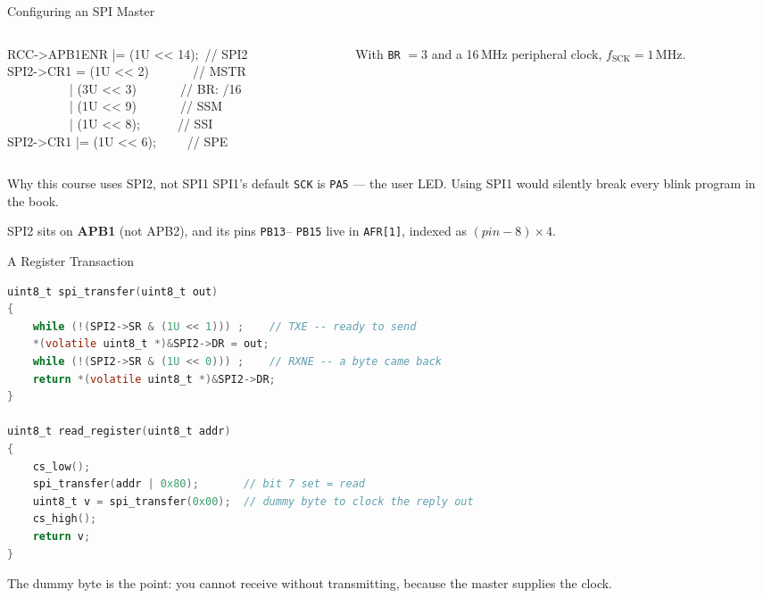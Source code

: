 \documentclass[9pt,aspectratio=169,xcolor=table]{beamer}
\begin{document}
\begin{frame}{Configuring an SPI Master}
    \begin{columns}[T]
    \begin{column}{.5\textwidth}
        {\ttfamily\scriptsize
        RCC->APB1ENR |= (1U << 14);~// SPI2 \\[1mm]
        SPI2->CR1 = (1U << 2)~~~~~~~// MSTR \\
        ~~~~~~~~~~| (3U << 3)~~~~~~~// BR: /16 \\
        ~~~~~~~~~~| (1U << 9)~~~~~~~// SSM \\
        ~~~~~~~~~~| (1U << 8);~~~~~~// SSI \\
        SPI2->CR1 |= (1U << 6);~~~~~// SPE}
    \end{column}
    \begin{column}{.46\textwidth}
        \begin{center}
        \end{center}

        \vspace{2mm}
        {\small With \texttt{BR} $=3$ and a 16\,MHz peripheral clock,
        $f_{\text{SCK}} = 1$\,MHz.}
    \end{column}
    \end{columns}

    \vspace{3mm}
    \begin{block}{Why this course uses SPI2, not SPI1}
        SPI1's default \texttt{SCK} is \alert{\texttt{PA5}} --- the user LED. Using
        SPI1 would silently break every blink program in the book.

        \vspace{1mm}
        SPI2 sits on \textbf{APB1} (not APB2), and its pins \texttt{PB13}--%
        \texttt{PB15} live in \texttt{AFR[1]}, indexed as $(pin-8) \times 4$.
    \end{block}
\end{frame}

\begin{frame}[fragile]{A Register Transaction}
\begin{lstlisting}[language=C, basicstyle=\ttfamily\scriptsize]
uint8_t spi_transfer(uint8_t out)
{
    while (!(SPI2->SR & (1U << 1))) ;    // TXE -- ready to send
    *(volatile uint8_t *)&SPI2->DR = out;
    while (!(SPI2->SR & (1U << 0))) ;    // RXNE -- a byte came back
    return *(volatile uint8_t *)&SPI2->DR;
}

uint8_t read_register(uint8_t addr)
{
    cs_low();
    spi_transfer(addr | 0x80);       // bit 7 set = read
    uint8_t v = spi_transfer(0x00);  // dummy byte to clock the reply out
    cs_high();
    return v;
}
\end{lstlisting}

    \vspace{1mm}
    {\small The \alert{dummy byte} is the point: you cannot receive without
    transmitting, because the master supplies the clock.}
\end{frame}
\end{document}
